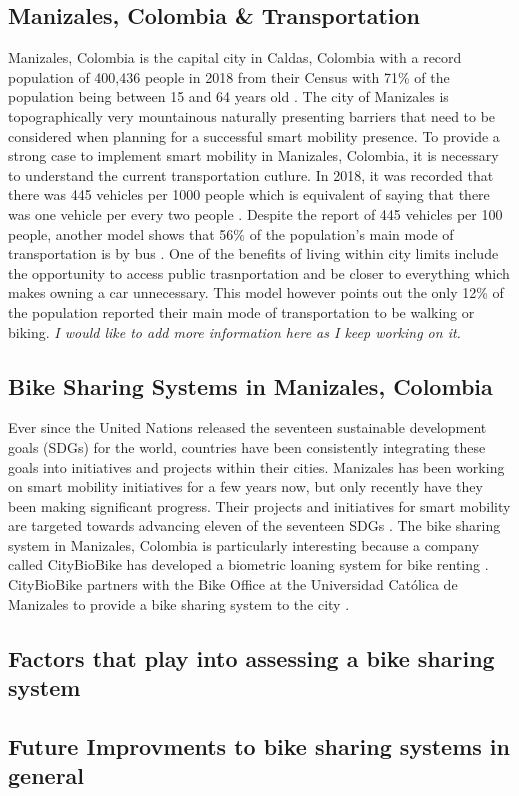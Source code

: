 \documentclass[12pt]{article}
\begin{document}
\subsection*{Manizales, Colombia \& Transportation}
Manizales, Colombia is the capital city in Caldas, Colombia with a record population of 400,436 people in 2018 from their Census with
71\% of the population being between 15 and 64 years old \cite{CalidaddeVida}. The city of Manizales is topographically very mountainous 
naturally presenting barriers that need to be considered when planning for a successful smart mobility presence. To provide a strong case
to implement smart mobility in Manizales, Colombia, it is necessary to understand the current transportation cutlure. In 2018, it was 
recorded that there was 445 vehicles per 1000 people which is equivalent of saying that there was one vehicle per every two people \cite{CalidaddeVida}.
Despite the report of 445 vehicles per 100 people, another model shows that 56\% of the population's main mode of transportation is by bus \cite{CalidaddeVida}. 
One of the benefits of living within city limits include the opportunity to access public trasnportation and be closer to everything which makes
owning a car unnecessary. This model however points out the only 12\% of the population reported their main mode of transportation to be walking or biking.     
\textit{I would like to add more information here as I keep working on it.}

\subsection*{Bike Sharing Systems in Manizales, Colombia}
Ever since the United Nations released the seventeen sustainable development goals (SDGs) for the world, countries have been consistently integrating
these goals into initiatives and projects within their cities. Manizales has been working on 
smart mobility initiatives for a few years now, but only recently have they been making significant progress. Their projects and initiatives for smart mobility 
are targeted towards advancing eleven of the seventeen SDGs \cite{OficinaDeLaBici}. The bike sharing system in Manizales, Colombia is particularly interesting 
because a company called CityBioBike has developed a biometric loaning system for bike renting \cite{CityBioBike}. CityBioBike partners with the Bike Office at 
the Universidad Católica de Manizales to provide a bike sharing system to the city \cite{OficinaDeLaBiciHome}.  

\subsection*{Factors that play into assessing a bike sharing system}

\subsection*{Future Improvments to bike sharing systems in general}



\end{document}
